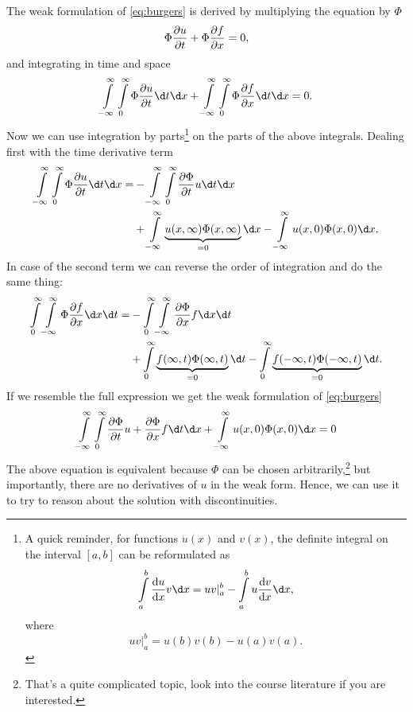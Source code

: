 \documentclass[justified, nobib, a4page]{tufte-handout}
\begin{document}
The weak formulation of \cref{eq:burgers} is derived by multiplying the equation by
\(\Phi\)
\[
	\Phi\pdv{u}{t} + \Phi\pdv{f}{x} = 0,
\]
and integrating in time and space
\[
	\int\limits_{-\infty}^{\infty} \int\limits_{0}^{\infty} \Phi\pdv{u}{t} \d t \d x
	+ \int\limits_{-\infty}^{\infty} \int\limits_{0}^{\infty} \Phi\pdv{f}{x}  \d t \d x= 0.
\]
Now we can use integration by parts\footnote{%
	A quick reminder, for functions \(u(x)\) and \(v(x)\), the definite integral on the
	interval \([a,b]\) can be reformulated as
	\[
		\int\limits_a^b \odv{u}{x} v \d x =
		uv|_a^b
		- \int\limits_a^b u\odv{v}{x}  \d x ,
	\]
	where
	\[
		uv|_a^b = u(b)v(b) - u(a)v(a).
	\]
}
on the parts of the above integrals. Dealing first with the time derivative term
\begin{equation*}
	\begin{split}
		\int\limits_{-\infty}^{\infty} \int\limits_{0}^{\infty} \Phi\pdv{u}{t} \d t \d x
		= & -\int\limits_{-\infty}^{\infty} \int\limits_{0}^{\infty} \pdv{\Phi}{t}u \d t \d x   \\
		  & + \int\limits_{-\infty}^{\infty} \underbrace{u(x, \infty)\Phi(x, \infty)}_{=0} \d x
		- \int\limits_{-\infty}^{\infty} u(x, 0)\Phi(x, 0) \d x.
	\end{split}
\end{equation*}
In case of the second term we can reverse the order of integration and do the same thing:
\begin{equation*}
	\begin{split}
		\int\limits_{0}^{\infty} \int\limits_{-\infty}^{\infty} \Phi\pdv{f}{x}  \d x \d t
		= & -\int\limits_{0}^{\infty} \int\limits_{-\infty}^{\infty} \pdv{\Phi}{x}f \d x \d t \\
		  & + \int\limits_{0}^{\infty} \underbrace{f(\infty, t)\Phi(\infty, t)}_{=0} \d t
		- \int\limits_{0}^{\infty} \underbrace{f(-\infty, t)\Phi(-\infty, t)}_{=0} \d t.
	\end{split}
\end{equation*}
If we resemble the full expression we get the weak formulation of \cref{eq:burgers}
\[
	\int\limits_{-\infty}^{\infty} \int\limits_{0}^{\infty} \pdv{\Phi}{t}u + \pdv{\Phi}{x}f \d t \d x
	+ \int\limits_{-\infty}^{\infty} u(x, 0)\Phi(x, 0) \d x
	= 0
\]
The above equation is equivalent because \(\Phi\) can be chosen arbitrarily,\footnote{%
	That's a quite complicated topic, look into the course literature if you are
	interested.}
but importantly, there are no derivatives of \(u\) in the weak form. Hence, we can
use it to try to reason about the solution with discontinuities.
\end{document}
